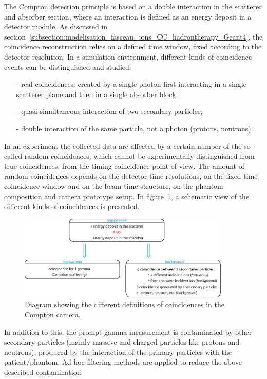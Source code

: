 The Compton detection principle is based on a double interaction in the scatterer and absorber section, where an interaction is defined as an energy deposit in a detector module. As discussed in section~\ref{subsection:modelisation_fasceau_ions_CC_hadrontherapy_Geant4}, the coincidence reconstruction relies on a defined time window, fixed according to the detector resolution. In a simulation environment, different kinds of coincidence events can be distinguished and studied: 
\begin{itemize}
\item[-] real coincidences: created by a single photon first interacting in a single scatterer plane and then in a single absorber block;
\item[-] quasi-simultaneous interaction of two secondary particles;
\item[-] double interaction of the same particle, not a photon (protons, neutrons).
\end{itemize}

In an experiment the collected data are affected by a certain number of the so-called random coincidences, which cannot be experimentally distinguished from true coincidences, from the timing coincidence point of view. The amount of random coincidences depends on the detector time resolutions, on the fixed time coincidence window and on the beam time structure, on the phantom composition and camera prototype setup. In figure~\ref{fig:fig_explication_coincidence_CC_simulation_Hadronth}, a schematic view of the different kinds of coincidences is presented.

\begin{figure}
  \centering
  \includegraphics[width=0.9\textwidth]{./Figure/Schema_coincidence_EN.eps}
  \caption{Diagram showing the different definitions of coincidences in the Compton camera.}
  \label{fig:fig_explication_coincidence_CC_simulation_Hadronth}
\end{figure}

In addition to this, the prompt gamma measurement is contaminated by other secondary particles (mainly massive and charged particles like protons and neutrons), produced by the interaction of the primary particles with the patient/phantom.
Ad-hoc filtering methods are applied to reduce the above described contamination.

